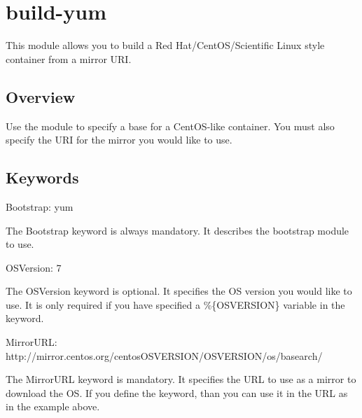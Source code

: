 \documentclass[letterpaper,10pt,english]{sphinxmanual}
\begin{document}
\section{build-yum}
\label{\detokenize{appendix:build-yum}}\label{\detokenize{appendix:id10}}\label{\detokenize{appendix:sec-build-yum}}
This module allows you to build a Red Hat/CentOS/Scientific Linux style container from a mirror URI.


\subsection{Overview}
\label{\detokenize{appendix:id11}}
Use the  module to specify a base for a CentOS-like container. You must also specify the URI for the mirror you would like to use.


\subsection{Keywords}
\label{\detokenize{appendix:id12}}
%
\begin{sphinxVerbatim}[commandchars=\\\{\}]
Bootstrap: yum
\end{sphinxVerbatim}

The Bootstrap keyword is always mandatory. It describes the bootstrap module to use.

%
\begin{sphinxVerbatim}[commandchars=\\\{\}]
OSVersion: 7
\end{sphinxVerbatim}

The OSVersion keyword is optional. It specifies the OS version you would like to use. It is only required if you have specified a \%\{OSVERSION\}
variable in the  keyword.

%
\begin{sphinxVerbatim}[commandchars=\\\{\}]
MirrorURL: http://mirror.centos.org/centos\PYGZhy{}\PYGZpc{}\PYGZob{}OSVERSION\PYGZcb{}/\PYGZpc{}\PYGZob{}OSVERSION\PYGZcb{}/os/\PYGZdl{}basearch/
\end{sphinxVerbatim}

The MirrorURL keyword is mandatory. It specifies the URL to use as a mirror to download the OS. If you define the  keyword, than you
can use it in the URL as in the example above.
\end{document}
